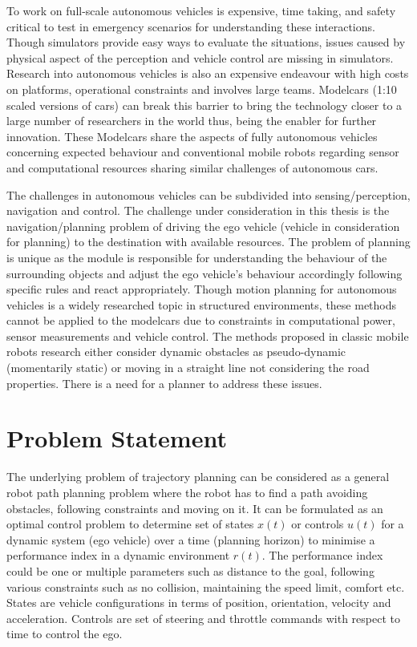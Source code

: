 To work on full-scale autonomous vehicles is expensive, time taking, and safety critical to test in emergency scenarios for understanding these interactions. Though simulators provide easy ways to evaluate the situations, issues caused by physical aspect of the perception and vehicle control are missing in simulators. Research into autonomous vehicles is also an expensive endeavour with high costs on platforms, operational constraints and involves large teams. Modelcars (1:10 scaled versions of cars) can break this barrier to bring the technology closer to a large number of researchers in the world thus, being the enabler for further innovation. These Modelcars share the aspects of fully autonomous vehicles concerning expected behaviour and conventional mobile robots regarding sensor and computational resources sharing similar challenges of autonomous cars. 

The challenges in autonomous vehicles can be subdivided into sensing/perception, navigation and control. The challenge under consideration in this thesis is the navigation/planning problem of driving the ego vehicle (vehicle in consideration for planning) to the destination with available resources. The problem of planning is unique as the module is responsible for understanding the behaviour of the surrounding objects and adjust the ego vehicle's behaviour accordingly following specific rules and react appropriately. Though motion planning for autonomous vehicles is a widely researched topic in structured environments, these methods cannot be applied to the modelcars due to constraints in computational power, sensor measurements and vehicle control. The methods proposed in classic mobile robots research either consider dynamic obstacles as pseudo-dynamic (momentarily static) or moving in a straight line not considering the road properties. There is a need for a planner to address these issues. 

\section{Problem Statement}

The underlying problem of trajectory planning can be considered as a general robot path planning problem where the robot has to find a path avoiding obstacles, following constraints and moving on it. It can be formulated as an optimal control problem to determine set of states $x(t)$ or controls $u(t)$ for a dynamic system (ego vehicle) over a time (planning horizon) to minimise a performance index in a dynamic environment $r(t)$. The performance index could be one or multiple parameters such as distance to the goal, following various constraints such as no collision, maintaining the speed limit, comfort etc. States are vehicle configurations in terms of position, orientation, velocity and acceleration. Controls are set of steering and throttle commands with respect to time to control the ego. 


